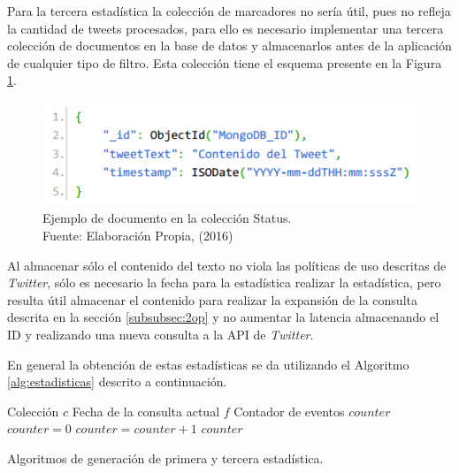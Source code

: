 Para la tercera estadística la colección de marcadores no sería útil, pues no refleja la cantidad de tweets procesados, para ello es necesario implementar una tercera colección de documentos en la base de datos y almacenarlos antes de la aplicación de cualquier tipo de filtro. Esta colección tiene el esquema presente en la Figura \ref{fig:esquemaTweet}.

\begin{figure}[H]
	\centering
	\captionsetup{justification=centering}
	\includegraphics[scale=0.8]{images/status.png}
	\caption[Ejemplo de documento en la colección Status.]{Ejemplo de documento en la colección Status.\\Fuente: Elaboración Propia, (2016)}
	\label{fig:esquemaTweet}
\end{figure}

Al almacenar sólo el contenido del texto no viola las políticas de uso descritas de \textit{Twitter}, sólo es necesario la fecha para la estadística realizar la estadística, pero resulta útil almacenar el contenido para realizar la expansión de la consulta descrita en la sección \ref{subsubsec:2op} y no aumentar la latencia almacenando el ID y realizando una nueva consulta a la API de \textit{Twitter}.

En general la obtención de estas estadísticas se da utilizando el Algoritmo \ref{alg:estadisticas} descrito a continuación.\\

\begin{algorithm}[H]
	\begin{algorithmic}
		\REQUIRE Colección $c$ 
		\REQUIRE Fecha de la consulta actual $f$ 
		\ENSURE Contador de eventos $counter$  
		\STATE $counter = 0$
				\STATE $counter = counter + 1$
			\ENDIF	
		\ENDFOR
		\RETURN $counter$
	\end{algorithmic}
	\caption{Algoritmos de generación de primera y tercera estadística.}
	\label{alg:estadisticas}
\end{algorithm}\vphantom\\

